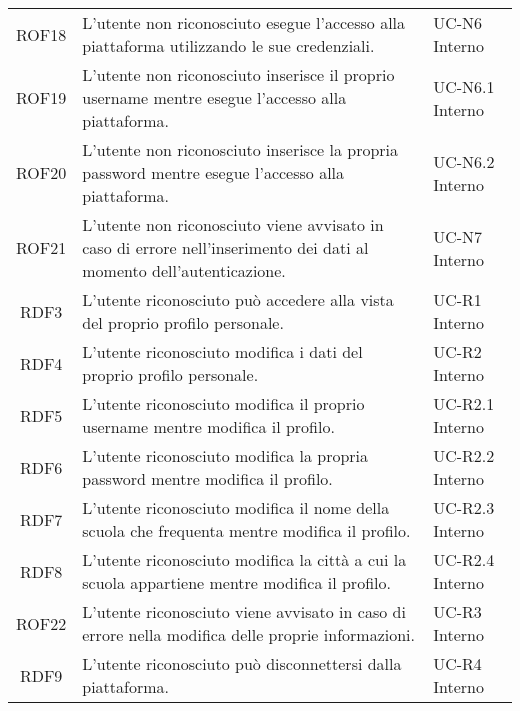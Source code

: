 \begin{tabularx}{\textwidth}{| c | p{10cm} | X |}
		ROF18 & L'utente non riconosciuto esegue l'accesso alla piattaforma utilizzando le sue credenziali. & UC-N6 \newline Interno\\
		ROF19 & L'utente non riconosciuto inserisce il proprio username mentre esegue l'accesso alla piattaforma. & UC-N6.1 \newline Interno\\
		ROF20 & L'utente non riconosciuto inserisce la propria password mentre esegue l'accesso alla piattaforma. & UC-N6.2 \newline Interno\\
		ROF21 & L'utente non riconosciuto viene avvisato in caso di errore nell'inserimento dei dati al momento dell'autenticazione. & UC-N7 \newline Interno\\

		RDF3 & L'utente riconosciuto può accedere alla vista del proprio profilo personale. & UC-R1 \newline Interno\\
		RDF4 & L'utente riconosciuto modifica i dati del proprio profilo personale. & UC-R2 \newline Interno\\
		RDF5 & L'utente riconosciuto modifica il proprio username mentre modifica il profilo. & UC-R2.1 \newline Interno\\
		RDF6 & L'utente riconosciuto modifica la propria password mentre modifica il profilo. & UC-R2.2 \newline Interno\\
		RDF7 & L'utente riconosciuto modifica il nome della scuola che frequenta mentre modifica il profilo. & UC-R2.3 \newline Interno\\
		RDF8 & L'utente riconosciuto modifica la città a cui la scuola appartiene mentre modifica il profilo. & UC-R2.4 \newline Interno\\
		ROF22 & L'utente riconosciuto viene avvisato in caso di errore nella modifica delle proprie informazioni. & UC-R3 \newline Interno\\	
		RDF9 & L'utente riconosciuto può disconnettersi dalla piattaforma. & UC-R4 \newline Interno\\	
		

\end{tabularx}
